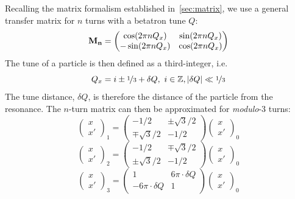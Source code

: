\documentclass[11pt]{report}
\begin{document}
Recalling the matrix formalism established in~\autoref{sec:matrix}, we use a general transfer matrix for $n$ turns with a betatron tune $Q$:
\begin{equation}
  \bf M_n=
  \begin{pmatrix}
    \cos(2\pi nQ_x)  & \sin(2\pi nQ_x) \\
    -\sin(2\pi nQ_x) & \cos(2\pi nQ_x)
  \end{pmatrix}
\end{equation}
The tune of a particle is then defined as a third-integer, i.e.
\begin{equation}
  Q_x=i\pm\nicefrac 13 +\delta Q,\ i\in\mathbb{Z}, |\delta Q|\ll\nicefrac 13
\end{equation} 
The tune distance, $\delta Q$, is therefore the distance of the particle from the resonance. The $n$-turn matrix can then be approximated for \textit{modulo}-3 turns:
\begin{equation}
  \begin{pmatrix}
    x\\x'
  \end{pmatrix}_1=
  \begin{pmatrix}
    -1/2 & \pm\sqrt{3}/2 \\
    \mp\sqrt{3}/2 & -1/2
  \end{pmatrix}\begin{pmatrix}
    x\\x'
  \end{pmatrix}_0
\end{equation}
\begin{equation}
  \begin{pmatrix}
    x\\x'
  \end{pmatrix}_2=
  \begin{pmatrix}
    -1/2 & \mp\sqrt{3}/2 \\
    \pm\sqrt{3}/2 & -1/2
  \end{pmatrix}\begin{pmatrix}
    x\\x'
  \end{pmatrix}_0
\end{equation}
\begin{equation}
  \begin{pmatrix}
    x\\x'
  \end{pmatrix}_3=
  \begin{pmatrix}
    1 & 6\pi\cdot\delta Q \\
    -6\pi\cdot\delta Q & 1
  \end{pmatrix}\begin{pmatrix}
    x\\x'
  \end{pmatrix}_0
\end{equation}
\end{document}
